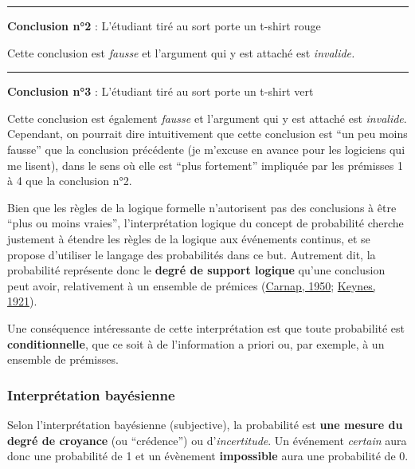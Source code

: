 \documentclass[
  a4paper,11pt,twoside,onecolumn,openright,final,oldfontcommands]{memoir}
\theoremstyle{definition}
\theoremstyle{definition}
\theoremstyle{definition}
\theoremstyle{definition}
\theoremstyle{remark}
\begin{document}
\par

\noindent

\rule{\textwidth}{1pt}

\textbf{Conclusion n°2} : L'étudiant tiré au sort porte un t-shirt rouge

Cette conclusion est \emph{fausse} et l'argument qui y est attaché est \emph{invalide.}

\par

\noindent

\rule{\textwidth}{1pt}

\textbf{Conclusion n°3} : L'étudiant tiré au sort porte un t-shirt vert

Cette conclusion est également \emph{fausse} et l'argument qui y est attaché est \emph{invalide}. Cependant, on pourrait dire intuitivement que cette conclusion est ``un peu moins fausse'' que la conclusion précédente (je m'excuse en avance pour les logiciens qui me lisent), dans le sens où elle est ``plus fortement'' impliquée par les prémisses 1 à 4 que la conclusion n°2.

Bien que les règles de la logique formelle n'autorisent pas des conclusions à être ``plus ou moins vraies'', l'interprétation logique du concept de probabilité cherche justement à étendre les règles de la logique aux événements continus, et se propose d'utiliser le langage des probabilités dans ce but. Autrement dit, la probabilité représente donc le \textbf{degré de support logique} qu'une conclusion peut avoir, relativement à un ensemble de prémices (\protect\hyperlink{ref-carnap_logical_1950}{Carnap, 1950}; \protect\hyperlink{ref-keynes_treatise_1921}{Keynes, 1921}).

Une conséquence intéressante de cette interprétation est que toute probabilité est \textbf{conditionnelle}, que ce soit à de l'information a priori ou, par exemple, à un ensemble de prémisses.

\hypertarget{interpruxe9tation-bayuxe9sienne}{%
\subsubsection{Interprétation bayésienne}\label{interpruxe9tation-bayuxe9sienne}}

Selon l'interprétation bayésienne (subjective), la probabilité est \textbf{une mesure du degré de croyance} (ou ``crédence'') ou d'\emph{incertitude}. Un événement \emph{certain} aura donc une probabilité de 1 et un évènement \textbf{impossible} aura une probabilité de 0.
\end{document}
